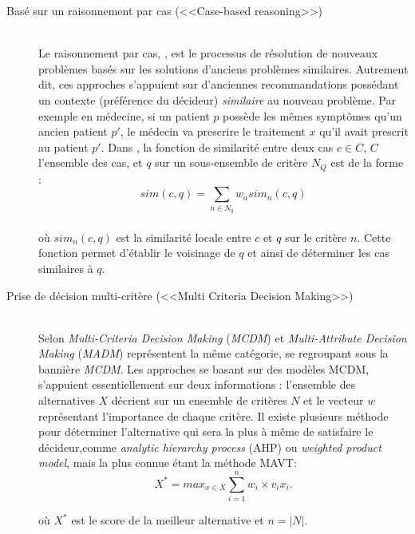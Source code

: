 \documentclass[a4paper, 11pt]{article}
\begin{document}
\begin{description}
    \item [Basé sur un raisonnement par cas (<<Case-based reasoning>>)]  \hfill \\
   Le raisonnement par cas, \citep{RiesbeckCBR}, est le processus de résolution de nouveaux problèmes basés sur les solutions d'anciens problèmes similaires. Autrement dit, ces approches s'appuient sur d'anciennes recommandations possédant un contexte (préférence du décideur) \textit{similaire} au nouveau problème. Par exemple en médecine, si un patient $p$ possède les mêmes symptômes qu'un ancien patient $p'$, le médecin va prescrire le traitement $x$ qu'il avait prescrit au patient $p'$. Dans \citep{Mcsherry2005}, la fonction de similarité entre deux cas $c \in C$, $C$ l'ensemble des cas, et $q$ sur un sous-ensemble de critère $N_Q$ est de la forme :\\
   
   \begin{equation}
   	sim(c,q)= \sum_{n \in N_q} w_a sim_n(c,q)
   \end{equation}\\
   
   où $sim_n(c,q)$ est la similarité locale entre $c$ et $q$ sur le critère $n$. Cette fonction permet d'établir le voisinage de $q$ et ainsi de déterminer les cas similaires à $q$.\\
    
    \item [Prise de décision multi-critère (<<Multi Criteria Decision Making>>)]  \hfill \\
   Selon \textcolor{blue}{\citep{Triantaphyllou2000}} \textit{Multi-Criteria Decision Making} (\textit{MCDM}) et \textit{Multi-Attribute Decision Making} (\textit{MADM}) représentent la même catégorie, se regroupant sous la bannière \textit{MCDM}. Les approches se basant sur des modèles MCDM, s'appuient essentiellement sur deux informations : l'ensemble des alternatives $X$ décrient sur un ensemble de critères $N$ et le vecteur $w$ représentant l'importance de chaque critère. Il existe plusieurs méthode pour déterminer l'alternative qui sera la plus à même de satisfaire le décideur,comme \textit{analytic hierarchy process} (AHP) \textcolor{blue}{\citep{Saaty}} ou  \textit{weighted product model}, mais la plus connue étant la méthode MAVT: 
   \begin{equation}
   		X^* = max_{x \in X} \sum_{i = 1}^n w_i \times v_i{x_i}. 
   \end{equation}
   
    où $X^*$ est le score de la meilleur alternative et $n = |N|$.
    
\end{description}
 
\end{document}
